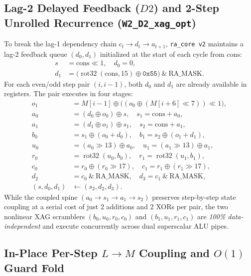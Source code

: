 \documentclass[conference]{IEEEtran}
\DeclareMathOperator{\rot}{rot32}
\begin{document}
\subsection{Lag-2 Delayed Feedback ($D2$) and 2-Step Unrolled Recurrence (\texttt{W2\_D2\_xag\_opt})}\label{sec:d2}

To break the lag-1 dependency chain $c_t \to d_t \to a_{t+1}$, \texttt{ra\_core v2} maintains a lag-2 feedback queue $(d_0, d_1)$ initialized at the start of each cycle from $\text{cons}$:
\begin{equation}
\begin{aligned}
s &= \text{cons} \ll 1, \quad d_0 = 0, \\
d_1 &= \big(\rot(\text{cons}, 15) \oplus \mathtt{0x55}\big) \ \& \ \text{RA\_MASK}.
\end{aligned}
\end{equation}
For each even/odd step pair $(i, i-1)$, both $d_0$ and $d_1$ are already available in registers. The pair executes in four stages:
\begin{equation}\label{eq:unrolled_pair}
\begin{aligned}
o_1 &= M[i-1] \oplus \big((o_0 \oplus (M[i+6] \ll 7)) \ll 1\big), \\
a_0 &= (d_0 \oplus o_0) \oplus s, \quad s_1 = \text{cons} + a_0, \\
a_1 &= (d_1 \oplus o_1) \oplus s_1, \quad s_2 = \text{cons} + a_1, \\
b_0 &= s_1 \oplus (o_0 + d_0), \quad b_1 = s_2 \oplus (o_1 + d_1), \\
u_0 &= (a_0 \gg 13) \oplus a_0, \quad u_1 = (a_1 \gg 13) \oplus a_1, \\
r_0 &= \rot(u_0, b_0), \quad r_1 = \rot(u_1, b_1), \\
c_0 &= r_0 \oplus (r_0 \gg 17), \quad c_1 = r_1 \oplus (r_1 \gg 17), \\
d_2 &= c_0 \ \& \ \text{RA\_MASK}, \quad d_3 = c_1 \ \& \ \text{RA\_MASK}, \\
(s, d_0, d_1) &\leftarrow (s_2, d_2, d_3).
\end{aligned}
\end{equation}
While the coupled spine $(a_0 \to s_1 \to a_1 \to s_2)$ preserves step-by-step state coupling at a serial cost of just 2 additions and 2 XORs per pair, the two nonlinear XAG scramblers $(b_0, u_0, r_0, c_0)$ and $(b_1, u_1, r_1, c_1)$ are \emph{100\% data-independent} and execute concurrently across dual superscalar ALU pipes.

\subsection{In-Place Per-Step $L \to M$ Coupling and $O(1)$ Guard Fold}\label{sec:coupling}
\end{document}
